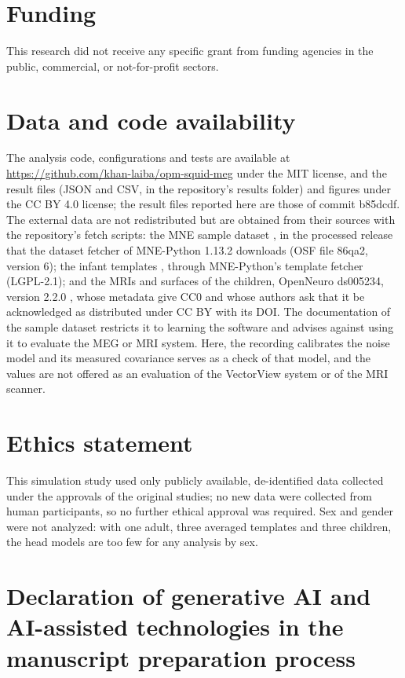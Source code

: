 \documentclass[preprint,12pt,authoryear,a4paper]{elsarticle}
\begin{document}
\section*{Funding}

This research did not receive any specific grant from funding agencies in the public, commercial, or not-for-profit sectors.

\section*{Data and code availability}

The analysis code, configurations and tests are available at \url{https://github.com/khan-laiba/opm-squid-meg} under the MIT license, and the result files (JSON and CSV, in the repository's results folder) and figures under the CC BY 4.0 license; the result files reported here are those of commit b85dcdf. The external data are not redistributed but are obtained from their sources with the repository's fetch scripts: the MNE sample dataset \citep{gramfort2013}, in the processed release that the dataset fetcher of MNE-Python 1.13.2 downloads (OSF file 86qa2, version 6); the infant templates \citep{oreilly2021,richards2016}, through MNE-Python's template fetcher (LGPL-2.1); and the MRIs and surfaces of the children, OpenNeuro ds005234, version 2.2.0 \citep{fadeev2025}, whose metadata give CC0 and whose authors ask that it be acknowledged as distributed under CC BY with its DOI. The documentation of the sample dataset restricts it to learning the software and advises against using it to evaluate the MEG or MRI system. Here, the recording calibrates the noise model and its measured covariance serves as a check of that model, and the values are not offered as an evaluation of the VectorView system or of the MRI scanner.

\section*{Ethics statement}

This simulation study used only publicly available, de-identified data collected under the approvals of the original studies; no new data were collected from human participants, so no further ethical approval was required. Sex and gender were not analyzed: with one adult, three averaged templates and three children, the head models are too few for any analysis by sex.

\section*{Declaration of generative AI and AI-assisted technologies in the manuscript preparation process}
\end{document}
